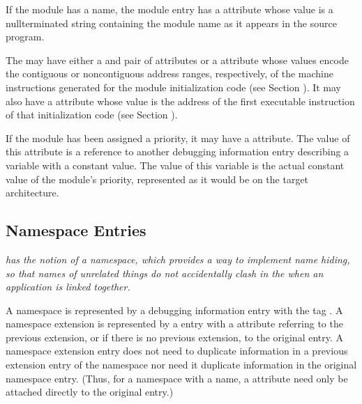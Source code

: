 If the module has a name, the module entry has a 
\DWATname{} attribute 
whose value is a null\dash terminated string containing
the module name as it appears in the source program.

The  may have either a 
\DWATlowpc{} and
\DWAThighpc{} 
pair 
of 
attributes or a 
\DWATranges{} attribute
whose values encode the contiguous or non\dash contiguous address
ranges, respectively, of the machine instructions generated for
the module initialization code 
(see Section ). 
\hypertarget{chap:DWATentrypcentryaddressofmoduleinitialization}{}
It may also
have a 
\DWATentrypc{} attribute whose value is the address of
the first executable instruction of that initialization code
(see Section ).

If 
\hypertarget{chap:DWATprioritymodulepriority}{}
the module has been assigned a priority, it may have 
a
\DWATpriority{} attribute. 
The value of this attribute is a
reference to another debugging information entry describing
a variable with a constant value. The value of this variable
is the actual constant value of the module\textquoteright s priority,
represented as it would be on the target architecture.

\subsection{Namespace Entries}
\label{chap:namespaceentries}
\textit{ has the notion of a namespace, which provides a way to
implement name hiding, so that names of unrelated things
do not accidentally clash in the 
 when an
application is linked together.}

A namespace is represented by a debugging information entry
with the 
tag \DWTAGnamespaceTARG. 
A namespace extension is
\hypertarget{chap:DWATextensionpreviousnamespaceextensionororiginalnamespace}{}
represented by a 
\DWTAGnamespace{} entry 
with 
a 
\DWATextension{}
attribute referring to the previous extension, or if there
is no previous extension, to the original 
\DWTAGnamespace{}
entry. A namespace extension entry does not need to duplicate
information in a previous extension entry of the namespace
nor need it duplicate information in the original namespace
entry. (Thus, for a namespace with a name, 
a \DWATname{} attribute 
need only be attached directly to the original
\DWTAGnamespace{} entry.)

